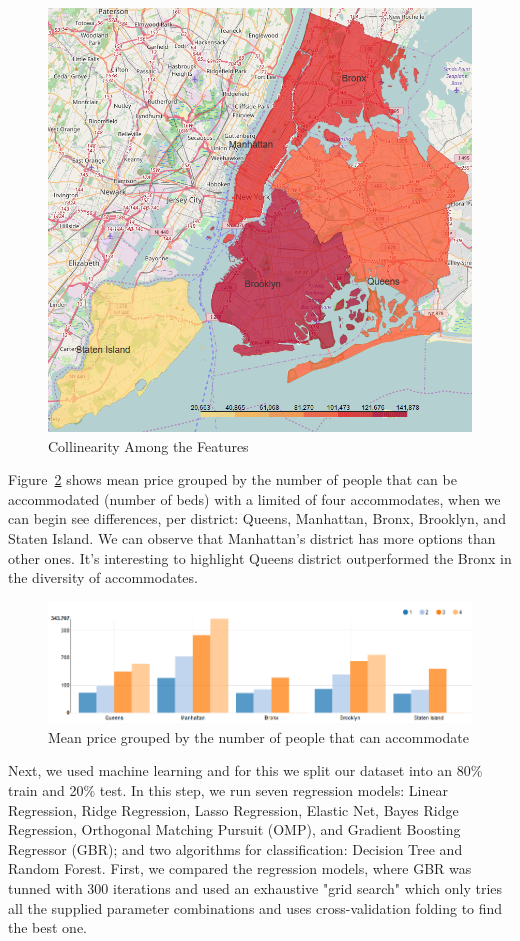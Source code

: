 \documentclass[sigconf]{acmart}
\begin{document}
\begin{figure}[!htpb]
	\centering
	\includegraphics[width=0.7\linewidth]{images/incidents_per_district}
	\caption{Collinearity Among the Features}
	\label{fig:datadistribution:incidents}
\end{figure}

Figure~\ref{fig:meanpriceperaccomodate} shows mean price grouped by the number of people that can be accommodated (number of beds)  with a limited of four accommodates, when we can begin see differences, per district: Queens, Manhattan, Bronx, Brooklyn, and Staten Island. We can observe that Manhattan's district has more options than other ones. It's interesting to highlight Queens district outperformed the Bronx in the diversity of accommodates. 

\begin{figure}[!htpb]
	\centering
	\includegraphics[width=\linewidth]{images/mean_price_per_accomodate}
	\caption{Mean price grouped by the number of people that can accommodate}
	\label{fig:meanpriceperaccomodate}
\end{figure}

Next, we used machine learning and for this we split our dataset into an 80\% train and 20\% test. In this step, we run seven regression models: Linear Regression, Ridge Regression, Lasso Regression, Elastic Net, Bayes Ridge Regression, Orthogonal Matching Pursuit (OMP), and Gradient Boosting Regressor (GBR); and two algorithms for classification: Decision Tree and Random Forest. First, we compared the regression models, where GBR was tunned with 300 iterations and used an exhaustive "grid search" which only tries all the supplied parameter combinations and uses cross-validation folding to find the best one.
\end{document}
